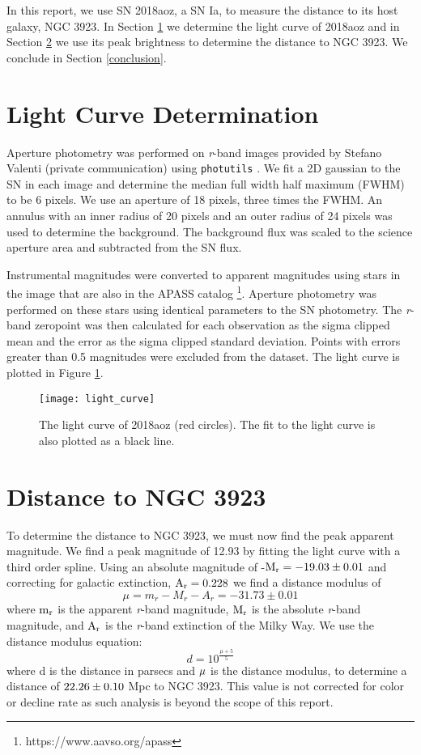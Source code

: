 \documentclass[11pt, oneside]{article}   	%
\begin{document}
In this report, we use SN 2018aoz, a SN Ia, to measure the distance to its host galaxy, NGC 3923.
In Section \ref{LC} we determine the light curve of 2018aoz and in Section \ref{Dist} we use its peak brightness to determine the distance to NGC 3923.
We conclude in Section \ref{conclusion}.

\section{Light Curve Determination}\label{LC}
Aperture photometry was performed on {\it r}-band images provided by Stefano Valenti (private communication) using {\tt photutils} \citep{2018bradley}. 
We fit a 2D gaussian to the SN in each image and determine the median full width half maximum (FWHM) to be 6 pixels. 
We use an aperture of 18 pixels, three times the FWHM.
An annulus with an inner radius of 20 pixels and an outer radius of 24 pixels was used to determine the background.
The background flux was scaled to the science aperture area and subtracted from the SN flux.

Instrumental magnitudes were converted to apparent magnitudes using stars in the image that are also in the APASS catalog \footnote{https://www.aavso.org/apass}.
Aperture photometry was performed on these stars using identical parameters to the SN photometry.
The {\it r}-band zeropoint was then calculated for each observation as the sigma clipped mean and the error as the sigma clipped standard deviation.
Points with errors greater than 0.5 magnitudes were excluded from the dataset.
The light curve is plotted in Figure \ref{fig:LC}.
\begin{figure}
\texttt{[image: light\_curve]}
\caption{The light curve of 2018aoz (red circles). 
The fit to the light curve is also plotted as a black line.\label{fig:LC}}
\end{figure}

\section{Distance to NGC 3923}\label{Dist}
To determine the distance to NGC 3923, we must now find the peak apparent magnitude.
We find a peak magnitude of 12.93 by fitting the light curve with a third order spline.
Using an absolute magnitude of -$\rm{M_{r} = -19.03 \pm 0.01}$ \citep{2010folatelli} and correcting for galactic extinction, $\rm{A_{r}=0.228}$ we find a distance modulus of 
\begin{equation}
\mu = m_{r}-M_{r}-A_{r} = -31.73\pm0.01
\end{equation}
where $\rm{m_{r}}$ is the apparent {\it r}-band magnitude, $\rm{M_{r}}$ is the absolute {\it r}-band magnitude, and $\rm{A_{r}}$ is the {\it r}-band extinction of the Milky Way.
We use the distance modulus equation:
\begin{equation}
d = 10^{\frac{\mu+5}{5}}
\end{equation}
where d is the distance in parsecs and $\rm{\mu}$ is the distance modulus, to determine a distance of $\rm{22.26 \pm 0.10}$ Mpc to NGC 3923.
This value is not corrected for color or decline rate as such analysis is beyond the scope of this report.
\end{document}
